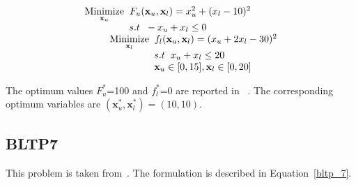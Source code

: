 \begin{equation}
\begin{array}{lr}
\underset{\mathbf{x}_u}{\text{Minimize}}\hspace{2mm} F_u(\mathbf{x}_u, \mathbf{ x}_l)=x_u^2+(x_l-10)^2\\

\hspace{16mm}s.t\hspace{2mm} -x_u+x_l\leq 0\\

\hspace{9mm} \underset{\mathbf{x}_l} {\text{Minimize}}\hspace{2mm} f_l(\mathbf{x}_u, \mathbf{ x}_l)=(x_u+2x_l-30)^2\\

\hspace{25mm}s.t\hspace{2mm} x_u+x_l\leq 20\\

\hspace{25mm} \mathbf{x}_u \in {[0,15]},\mathbf{x}_l \in [0,20] \\
\end{array}
\label{bltp_6}
\end{equation}

The optimum values $F_u^*$=100 and  $f_l^*$=0 are reported in ~\cite{Angelobilevel}. The corresponding optimum variables are $(\mathbf{x}^*_u, \mathbf{x}^*_l)=(10,10).$

\subsection{BLTP7}

This problem is taken from~\cite{anandalingam1990solution}. The formulation is described in Equation~\ref{bltp_7}. 

